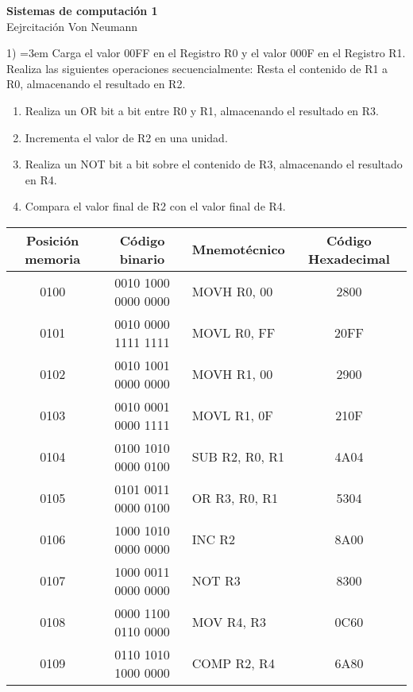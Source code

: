 \documentclass[a4paper,12pt]{article}
\begin{document}
	
	\begin{center}
		
		\LARGE \textbf{Sistemas de computación 1} \\[0.5cm]
		\LARGE Eejrcitación Von Neumann \\
	\end{center}
	
	1) \hangindent=3em Carga el valor 00FF en el Registro R0 y el valor 000F en el Registro R1. Realiza las siguientes operaciones secuencialmente:
	Resta el contenido de R1 a R0, almacenando el resultado en R2.
	\begin{enumerate}
		\item Realiza un OR bit a bit entre R0 y R1, almacenando el resultado en R3.
		\item Incrementa el valor de R2 en una unidad.
		\item Realiza un NOT bit a bit sobre el contenido de R3, almacenando el resultado en R4.
		\item Compara el valor final de R2 con el valor final de R4.
	\end{enumerate}

	\begin{tabular}{c|c|l|c}
	\textbf{Posición memoria} & \textbf{Código binario} & \textbf{Mnemotécnico} & \textbf{Código Hexadecimal}\\
	\hline
	0100 & 0010 1000 0000 0000 & MOVH R0, 00 & 2800 \\
	0101 & 0010 0000 1111 1111 & MOVL R0, FF & 20FF \\
	0102 & 0010 1001 0000 0000 & MOVH R1, 00 & 2900 \\
	0103 & 0010 0001 0000 1111 & MOVL R1, 0F & 210F \\
	0104 & 0100 1010 0000 0100 & SUB R2, R0, R1 & 4A04 \\
	0105 & 0101 0011 0000 0100 & OR R3, R0, R1 & 5304 \\
	0106 & 1000 1010 0000 0000 & INC R2 & 8A00 \\
	0107 & 1000 0011 0000 0000 & NOT R3 & 8300 \\
	0108 & 0000 1100 0110 0000 & MOV R4, R3 & 0C60 \\
	0109 & 0110 1010 1000 0000 & COMP R2, R4 & 6A80 \\
	\end{tabular}	
	
\end{document}
